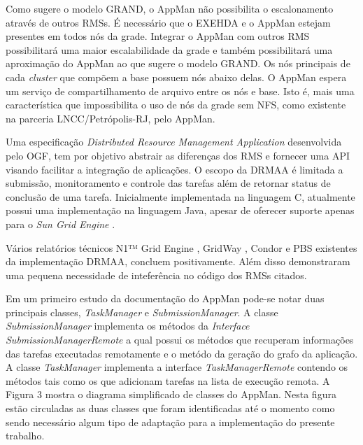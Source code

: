 Como sugere o modelo GRAND, o AppMan não possibilita o escalonamento através de outros RMSs. É necessário que o EXEHDA e o AppMan estejam presentes em todos nós da grade. Integrar o AppMan com outros RMS possibilitará uma maior escalabilidade da grade e também possibilitará uma aproximação do AppMan ao que sugere o modelo GRAND. Os nós principais de cada {\it cluster} que compõem a base possuem nós abaixo delas. O AppMan espera um serviço de compartilhamento de arquivo entre os nós e base. Isto é, mais uma característica que impossibilita o uso de nós da grade sem NFS, como existente na parceria LNCC/Petrópolis-RJ, pelo AppMan.

Uma especificação {\it Distributed Resource Management Application} \cite{Rajic2002} desenvolvida pelo OGF, tem por objetivo abstrair as diferenças dos RMS e fornecer uma API visando facilitar a integração de aplicações. O escopo da DRMAA é limitada a submissão, monitoramento e controle das tarefas além de retornar status de conclusão de uma tarefa. Inicialmente implementada na linguagem C, atualmente possui uma implementação na linguagem Java, apesar de oferecer suporte apenas para o {\it Sun Grid Engine} \cite{Templeton}.

Vários relatórios técnicos N1™ Grid Engine \cite{Templeton2006}, GridWay \cite{Herrera2007}, Condor \cite{Troeger2007} e PBS \cite{Ciesnik2007} existentes da implementação DRMAA, concluem positivamente. Além disso demonstraram uma pequena necessidade de inteferência no código dos RMSs citados.

Em um primeiro estudo da documentação do AppMan pode-se notar duas principais classes, {\it TaskManager} e {\it SubmissionManager}. A classe {\it SubmissionManager} implementa os métodos da {\it Interface SubmissionManagerRemote} a qual possui os métodos que recuperam informações das tarefas executadas remotamente e o metódo da geração do grafo da aplicação. A classe {\it TaskManager } implementa a interface {\it TaskManagerRemote} contendo os métodos tais como os que adicionam tarefas na lista de execução remota.  A Figura 3 mostra o diagrama simplificado de classes do AppMan. Nesta figura estão circuladas as duas classes que foram identificadas até o momento como sendo necessário algum tipo de adaptação para a implementação do presente trabalho.


